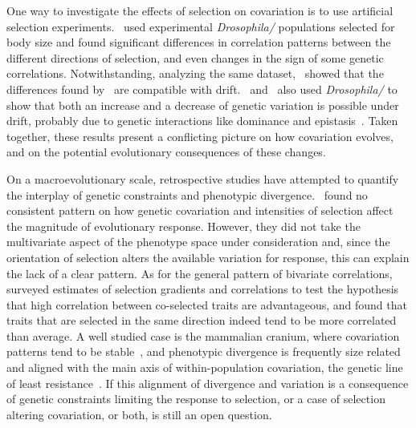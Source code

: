 \begin{refsection}
One way to investigate the effects of selection on covariation is to use
artificial selection experiments.~\textcite{Wilkinson1990-ym} used experimental
\emph{Drosophila/} populations selected for body size and found
significant differences in correlation patterns between the different
directions of selection, and even changes in the sign of some genetic
correlations. Notwithstanding, analyzing the same dataset,~\textcite{Shaw1995-nb}
showed that the differences found by~\textcite{Wilkinson1990-ym} are compatible with
drift.~\textcite{Bryant1986-os} and~\textcite{Whitlock2002-yb} also used \emph{Drosophila/} to
show that both an increase and a decrease of genetic variation is
possible under drift, probably due to genetic interactions like
dominance and epistasis~\parencite{Cheverud1995-nm}. Taken together, these
results present a conflicting picture on how covariation evolves, and on
the potential evolutionary consequences of these changes.

On a macroevolutionary scale, retrospective studies have attempted to
quantify the interplay of genetic constraints and phenotypic
divergence.~\textcite{Pitchers2014-wx} found no consistent pattern on how genetic
covariation and intensities of selection affect the magnitude of
evolutionary response. However, they did not take the multivariate
aspect of the phenotype space under consideration and, since the
orientation of selection alters the available variation for response,
this can explain the lack of a clear pattern. As for the general pattern
of bivariate correlations,~\textcite{Roff2012-fe} surveyed estimates of selection
gradients and correlations to test the hypothesis that high correlation
between co-selected traits are advantageous, and found that traits that
are selected in the same direction indeed tend to be more correlated
than average. A well studied case is the mammalian cranium, where
covariation patterns tend to be stable~\parencite{Porto2009-pi}, and phenotypic
divergence is frequently size related and aligned with the main axis of
within-population covariation, the genetic line of least
resistance~\parencite{Schluter1996-gw, Marroig2010-be, Marroig2012-jd, Porto2013-dc}. If
this alignment of divergence and variation is a consequence of genetic
constraints limiting the response to selection, or a case of selection
altering covariation, or both, is still an open question.


\end{refsection}

